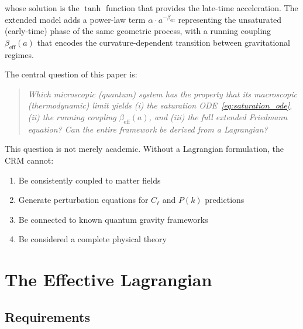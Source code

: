 \documentclass[aps,prd,twocolumn,superscriptaddress,nofootinbib]{revtex4-2}
\begin{document}
whose solution is the $\tanh$ function that provides the late-time acceleration. The extended model adds a power-law term $\alpha \cdot a^{-\beta_{\mathrm{eff}}}$ representing the unsaturated (early-time) phase of the same geometric process, with a running coupling $\beta_{\mathrm{eff}}(a)$ that encodes the curvature-dependent transition between gravitational regimes.

The central question of this paper is:

\begin{quote}
\textit{Which microscopic (quantum) system has the property that its macroscopic (thermodynamic) limit yields (i) the saturation ODE~\eqref{eq:saturation_ode}, (ii) the running coupling $\beta_{\mathrm{eff}}(a)$, and (iii) the full extended Friedmann equation? Can the entire framework be derived from a Lagrangian?}
\end{quote}

This question is not merely academic. Without a Lagrangian formulation, the CRM cannot:
\begin{enumerate}
\item Be consistently coupled to matter fields
\item Generate perturbation equations for $C_\ell$ and $P(k)$ predictions
\item Be connected to known quantum gravity frameworks
\item Be considered a complete physical theory
\end{enumerate}


\section{The Effective Lagrangian}
\label{sec:lagrangian}

\subsection{Requirements}
\end{document}
